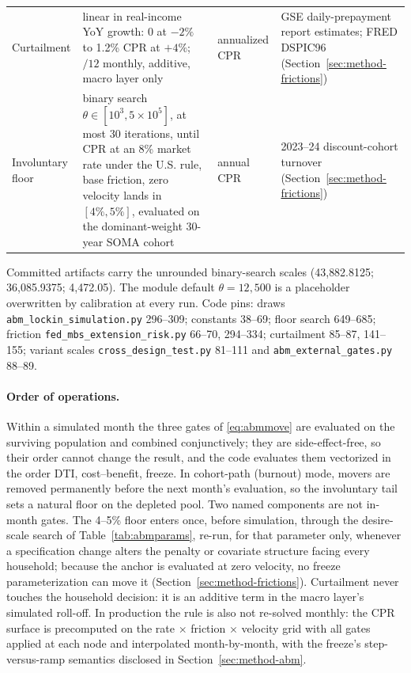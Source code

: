\documentclass[12pt]{article}
\begin{document}
\begin{table}[H]
\begin{threeparttable}
\begin{tabular}{@{}p{3.3cm}p{5.9cm}p{1.6cm}p{4.0cm}@{}}
Curtailment & linear in real-income YoY growth: 0 at $-2\%$ to 1.2\% CPR at $+4\%$; $/12$ monthly, additive, macro layer only & annualized CPR & GSE daily-prepayment report estimates; FRED DSPIC96 (Section~\ref{sec:method-frictions}) \\
Involuntary floor & binary search $\theta \in [10^{3}, 5\times10^{5}]$, at most 30 iterations, until CPR at an 8\% market rate under the U.S. rule, base friction, zero velocity lands in $[4\%, 5\%]$, evaluated on the dominant-weight 30-year SOMA cohort & annual CPR & 2023--24 discount-cohort turnover (Section~\ref{sec:method-frictions}) \\
\bottomrule
\end{tabular}
\begin{tablenotes}
\footnotesize
\item Committed artifacts carry the unrounded binary-search scales (43{,}882.8125; 36{,}085.9375; 4{,}472.05). The module default $\theta = 12{,}500$ is a placeholder overwritten by calibration at every run. Code pins: draws \texttt{abm\_lockin\_simulation.py} 296--309; constants 38--69; floor search 649--685; friction \texttt{fed\_mbs\_extension\_risk.py} 66--70, 294--334; curtailment 85--87, 141--155; variant scales \texttt{cross\_design\_test.py} 81--111 and \texttt{abm\_external\_gates.py} 88--89.
\end{tablenotes}
\end{threeparttable}
\end{table}

\paragraph{Order of operations.}
Within a simulated month the three gates of \eqref{eq:abmmove} are evaluated on the surviving population and combined conjunctively; they are side-effect-free, so their order cannot change the result, and the code evaluates them vectorized in the order DTI, cost--benefit, freeze. %
In cohort-path (burnout) mode, movers are removed permanently before the next month's evaluation, so the involuntary tail sets a natural floor on the depleted pool. %
Two named components are not in-month gates. The 4--5\% floor enters once, before simulation, through the desire-scale search of Table~\ref{tab:abmparams}, re-run, for that parameter only, whenever a specification change alters the penalty or covariate structure facing every household; because the anchor is evaluated at zero velocity, no freeze parameterization can move it (Section~\ref{sec:method-frictions}). %
Curtailment never touches the household decision: it is an additive term in the macro layer's simulated roll-off. In production the rule is also not re-solved monthly: the CPR surface is precomputed on the rate $\times$ friction $\times$ velocity grid with all gates applied at each node and interpolated month-by-month, with the freeze's step-versus-ramp semantics disclosed in Section~\ref{sec:method-abm}. %
\end{document}
